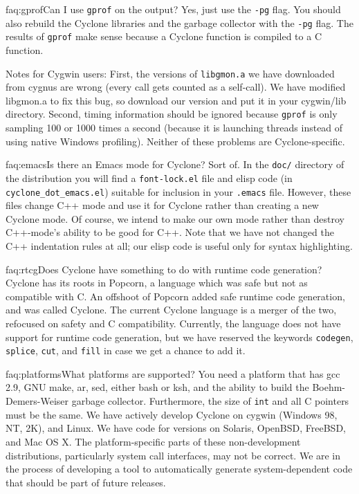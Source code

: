 \begin{faqa}{faq:gprof}{Can I use \texttt{gprof} on the output?}
Yes, just use the \texttt{-pg} flag.  You should also rebuild the
Cyclone libraries and the garbage collector with the \texttt{-pg}
flag.  The results of \texttt{gprof} make sense because a Cyclone
function is compiled to a C function.

Notes for Cygwin users: First, the versions of \texttt{libgmon.a} we
have downloaded from cygnus are wrong (every call gets counted as a
self-call).  We have modified libgmon.a to fix this bug, so download
our version and put it in your cygwin/lib directory.  Second, timing
information should be ignored because \texttt{gprof} is only sampling
100 or 1000 times a second (because it is launching threads instead of
using native Windows profiling).  Neither of these problems are
Cyclone-specific.
\end{faqa}

\begin{faqa}{faq:emacs}{Is there an Emacs mode for Cyclone?}
Sort of.  In the \texttt{doc/} directory of the distribution you will
find a \texttt{font-lock.el} file and elisp code (in
\texttt{cyclone_dot_emacs.el}) suitable for inclusion in your
\texttt{.emacs} file.  However, these files change C++ mode and use it
for Cyclone rather than creating a new Cyclone mode.  Of course, we
intend to make our own mode rather than destroy C++-mode's ability to
be good for C++.  Note that we have not changed the C++ indentation
rules at all; our elisp code is useful only for syntax highlighting.
\end{faqa}

\begin{faqa}{faq:rtcg}{Does Cyclone have something to do with runtime code generation?}
Cyclone has its roots in Popcorn, a language which was safe but not as
compatible with C\@.  An offshoot of Popcorn added safe runtime code
generation, and was called Cyclone.  The current Cyclone language is a
merger of the two, refocused on safety and C compatibility.
Currently, the language does not have support for runtime code
generation, but we have reserved the keywords \texttt{codegen},
\texttt{splice}, \texttt{cut}, and \texttt{fill} in case we get a
chance to add it.
\end{faqa}

\begin{faqa}{faq:platforms}{What platforms are supported?}
You need a platform that has gcc 2.9, GNU make, ar, sed, either bash or ksh,
and the ability to build the Boehm-Demers-Weiser garbage collector.
Furthermore, the size of \texttt{int} and all C pointers must be the same.
We have actively develop Cyclone on cygwin (Windows 98, NT, 2K), and Linux.
We have code for versions on Solaris, OpenBSD, FreeBSD, and Mac OS X.  The
platform-specific parts of these non-development distributions, particularly
system call interfaces, may not be correct.  We are in the process of
developing a tool to automatically generate system-dependent code that
should be part of future releases.
\end{faqa}

